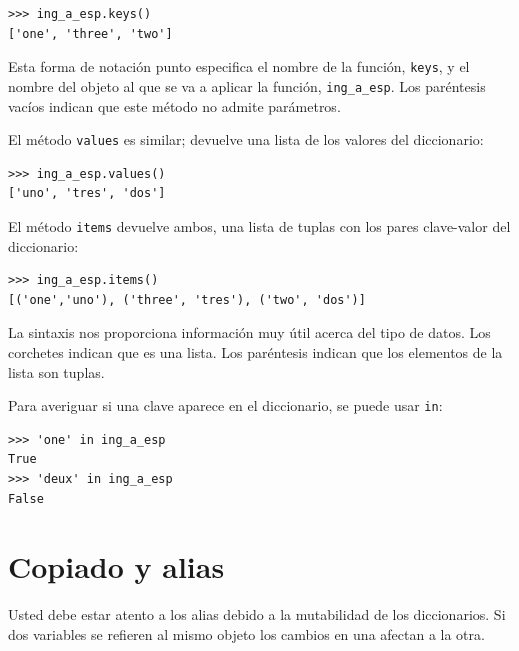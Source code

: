 \begin{lstlisting}
>>> ing_a_esp.keys()
['one', 'three', 'two']
\end{lstlisting}
 Esta forma de notación punto especifica el nombre de la función,
\texttt{keys}, y el nombre del objeto al que se va a aplicar la función,
\texttt{ing\_a\_esp}. Los paréntesis vacíos indican que este método
no admite parámetros.

El método \texttt{values} es similar; devuelve una lista de los valores
del diccionario:
\begin{lstlisting}
>>> ing_a_esp.values()
['uno', 'tres', 'dos']
\end{lstlisting}
El método \texttt{items} devuelve ambos, una lista de tuplas con los
pares clave-valor del diccionario:
\begin{lstlisting}
>>> ing_a_esp.items()
[('one','uno'), ('three', 'tres'), ('two', 'dos')]
\end{lstlisting}
La sintaxis nos proporciona información muy útil acerca del tipo de
datos. Los corchetes indican que es una lista. Los paréntesis indican
que los elementos de la lista son tuplas.

Para averiguar si una clave aparece en el diccionario, se puede usar
\texttt{in}:
\begin{lstlisting}
>>> 'one' in ing_a_esp
True
>>> 'deux' in ing_a_esp
False
\end{lstlisting}

\section{Copiado y alias}

  

Usted debe estar atento a los alias debido a la mutabilidad de los
diccionarios. Si dos variables se refieren al mismo objeto los cambios
en una afectan a la otra.


